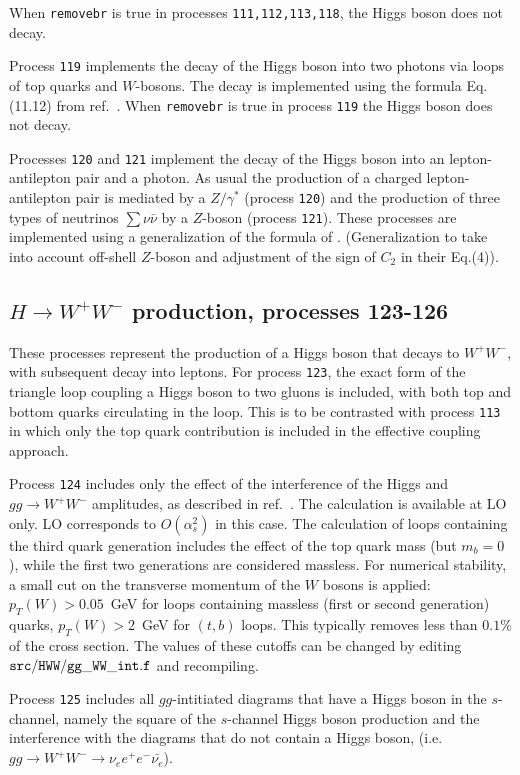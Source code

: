 \documentclass{article}
\begin{document}
When {\tt removebr} is true in processes {\tt 111,112,113,118},
the Higgs boson does not decay.

Process {\tt 119} implements the decay of the Higgs boson into two photons
via loops of top quarks and $W$-bosons.
The decay is implemented using the formula Eq.(11.12) from ref.~\cite{Ellis:1991qj}.
When {\tt removebr} is true in process {\tt 119} the Higgs boson does not decay.

Processes {\tt 120} and {\tt 121} implement the decay of the Higgs boson into an lepton-antilepton
pair and a photon. As usual the production of a charged lepton-antilepton pair is mediated by a 
$Z/\gamma^*$ (process {\tt 120}) and the production of three types of neutrinos 
$\sum  \nu \bar{\nu}$ by a $Z$-boson (process {\tt 121}). These processes are implemented 
using a generalization of the formula of \cite{Djouadi:1996yq}. (Generalization to take into
account off-shell $Z$-boson and adjustment of the sign of $C_2$ in their Eq.(4)).


\subsection{$H \to W^+W^-$ production, processes 123-126}
These processes represent the production of a Higgs boson that decays to $W^+ W^-$,
with subsequent decay into leptons. For process {\tt 123}, the exact form of the triangle
loop coupling a Higgs boson to two gluons is included, with both top and bottom quarks
circulating in the loop. This is to be contrasted with process {\tt 113} in which only the
top quark contribution is included in the effective coupling approach.

Process {\tt 124} includes only the effect of the interference of the
Higgs and $gg \to W^+W^-$ amplitudes, as described in ref.~\cite{Campbell:2011cu}.
The calculation is available at LO only. LO corresponds to $O(\alpha_s^2)$ in this case.
The calculation of loops containing the third quark generation
includes the effect of the top quark mass (but $m_b=0$), while the first two
generations are considered massless. For numerical stability, a small cut on the
transverse momentum of the $W$ bosons is applied: $p_T(W)>0.05$~GeV for loops
containing massless (first or second generation) quarks, $p_T(W)>2$~GeV for $(t,b)$
loops. This typically removes less than $0.1$\% of the cross section. The
values of these cutoffs can be changed by editing ${\tt src/HWW/gg\_WW\_int.f}$ and recompiling.

Process {\tt 125} includes all $gg$-intitiated diagrams that have a Higgs boson in the $s$-channel,
namely the square of the $s$-channel Higgs boson production and the interference with the diagrams
that do not contain a Higgs boson, (i.e. $gg \to W^+W^- \to \nu_e e^+ e^- \bar{\nu_e}$).
\end{document}
